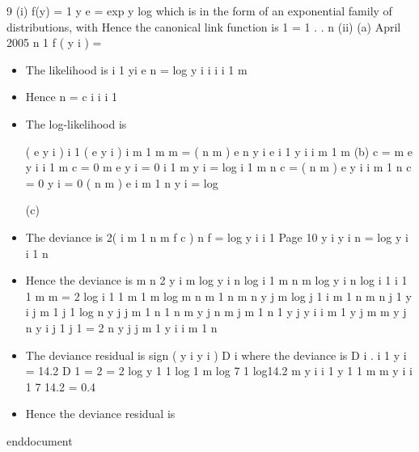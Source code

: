 \documentclass[a4paper,12pt]{article}
\begin{document}
9
(i)
f(y) =
1
y
e
= exp
y
log
which is in the form of an exponential family of distributions, with
Hence the canonical link function is
1
=
1
.
.
n
(ii)
(a)
April 2005
n
1
f ( y i ) =
\begin{itemize}
\item The likelihood is
i 1
yi
e
n
=
log
y i
i
i
i 1
m
\item Hence
n
=
c
i
i
i 1
\item The log-likelihood is

(
e
y i )
i 1
(
e y i )
i m 1
m
m
=
( n m )
e
n
y i
e
i 1
y i
i m 1
m
(b)
c
= m e
y i
i 1
m
c
= 0
m e
y i = 0
i 1
m
y i
= log
i 1
m
n
c
= ( n m ) e
y i
i m 1
n
c
= 0
y i = 0
( n m ) e
i m 1
n
y i
= log

(c)
\item The deviance is 2(
i m 1
n m
f
c )
n
f
=
log y i
i 1
Page 10
y i
y i
n
=
log y i
i 1
n
\item Hence the deviance is
m
n
2
y i
m
log y i
n
log
i 1
m
n
m
log y i
n
log
i 1
i 1
1
m
m
= 2
log
i 1
1
m
1
m
log
m
n m
1
n m
n
y j
m
log
j 1
i m 1
n m
n
j 1
y i
j m 1
j 1
log
n
y j
j m 1
n
1
n m
y j
n m
j m 1
n
1
y j
y i
i m 1
y j
m
m
y j
n
y i
j 1
j 1
= 2
n
y j
j m 1
y i
i m 1
n
\item The deviance residual is sign ( y i
y i ) D i where the deviance is
D i .
i 1
y i = 14.2
D 1 = 2
= 2
log y 1 1 log
1
m
log 7 1 log14.2
m
y i
i 1
y 1
1
m
m
y i
i 1
7
14.2
= 0.4
\item Hence the deviance residual is
\end{itemize}
end{document}
\end{document}
